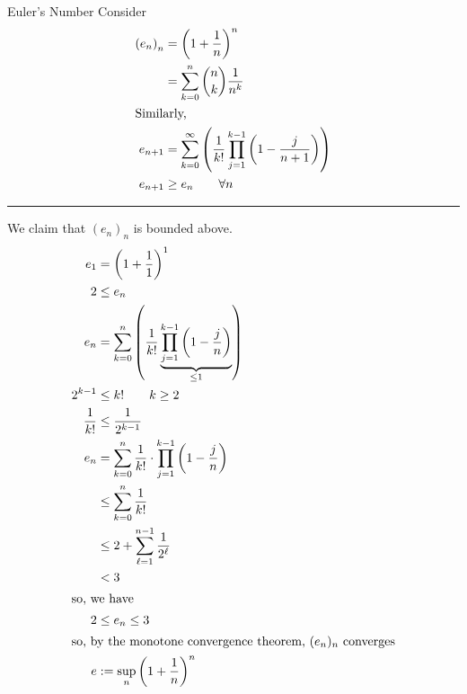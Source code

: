 \documentclass[10pt]{extarticle}
\begin{document}
  \begin{problem}{Euler's Number}
    Consider
    \begin{align*}
      \left(e_n\right)_n &= \left(1 + \frac{1}{n}\right)^n\\
                         &= \sum_{k=0}^{n} {n\choose k}\frac{1}{n^k}\\
                         \shortintertext{Similarly,}
      e_{n+1} &= \sum_{k=0}^{\infty}\left(\frac{1}{k!} \prod_{j=1}^{k-1}\left(1-\frac{j}{n+1}\right)\right)\\
      e_{n+1} &\geq e_{n} \tag*{$\forall n$}
    \end{align*}
    \vspace{4pt}
    \rule{\textwidth}{0.4pt}
    \vspace{4pt}
    We claim that $(e_n)_n$ is bounded above.
    \begin{align*}
      e_{1} &= \left(1 + \frac{1}{1}\right)^{1}\\
      2 &\leq e_n\\
      e_{n} &= \sum_{k=0}^{n}\left(\frac{1}{k!} \underbrace{\prod_{j=1}^{k-1}\left(1-\frac{j}{n}\right)}_{\leq 1}\right)\\
      2^{k-1} &\leq k!\tag*{$k\geq 2$}\\
      \frac{1}{k!} &\leq \frac{1}{2^{k-1}}\\
      e_{n} &= \sum_{k=0}^{n} \frac{1}{k!} \cdot \prod_{j=1}^{k-1}\left(1 - \frac{j}{n}\right)\\
            &\leq \sum_{k=0}^{n}\frac{1}{k!}\\
            &\leq 2 + \sum_{\ell=1}^{n-1} \frac{1}{2^{\ell}}\\
            &< 3\\
            \shortintertext{so, we have}
      2 &\leq e_{n} \leq 3\\
      \shortintertext{so, by the monotone convergence theorem, $(e_n)_n$ converges}
      e &:= \sup_{n}\left(1 + \frac{1}{n}\right)^{n}
    \end{align*}
  \end{problem}
\end{document}
